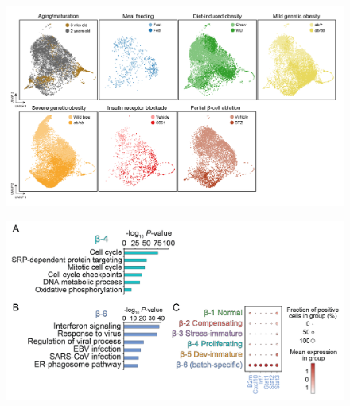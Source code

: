 


\begin{figure}[H]
\centering
\includegraphics[width=\linewidth]{Appendix2/Fig/F3-4-01.png}
\caption[β-cell subset across seven studies]{}
\label{suppl_fig:chp3_betastudy}
\end{figure}

\begin{figure}[H]
\centering
\includegraphics[width=\linewidth]{Appendix2/Fig/F3-1-v2-01.png}
\caption[Characterization of β-cell subsets using enriched markers and gene ontology]{}
\label{suppl_fig:chp3_betasubsets}
\end{figure}


